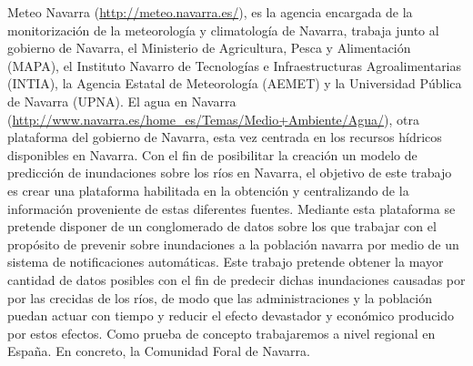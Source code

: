\newline
Meteo Navarra (\url{http://meteo.navarra.es/}), es la agencia encargada de la  monitorización de la meteorología y climatología de Navarra, trabaja junto al gobierno de Navarra, el Ministerio de Agricultura, Pesca y Alimentación (MAPA), el Instituto Navarro de Tecnologías e Infraestructuras Agroalimentarias (INTIA), la Agencia Estatal de Meteorología (AEMET) y la Universidad Pública de Navarra (UPNA).\newline
\newline
El agua en Navarra (\url{http://www.navarra.es/home_es/Temas/Medio+Ambiente/Agua/}), otra plataforma del gobierno de Navarra, esta vez centrada en los recursos hídricos disponibles en Navarra.\newline
\newline
Con el fin de posibilitar la creación un modelo de predicción de inundaciones sobre los ríos en Navarra, el objetivo de este trabajo es crear una plataforma habilitada en la obtención y centralizando de la información proveniente de estas diferentes fuentes. Mediante esta plataforma se pretende disponer de un conglomerado de datos sobre los que trabajar con el propósito de prevenir sobre inundaciones a la población navarra por medio de un sistema de notificaciones automáticas.\newline
\newline
Este trabajo pretende obtener la mayor cantidad de datos posibles con el fin de predecir dichas inundaciones causadas por por las crecidas de los ríos, de modo que las administraciones y la población puedan actuar con tiempo y reducir el efecto devastador y económico producido por estos efectos. Como prueba de concepto trabajaremos a nivel regional en España. En concreto, la Comunidad Foral de Navarra.


